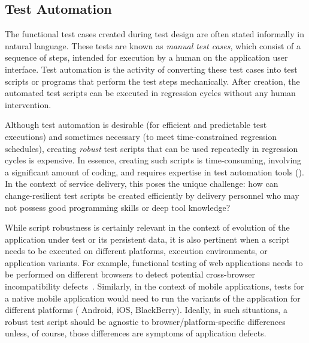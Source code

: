 \subsection{Test Automation}
\label{sec:test-automation}

The functional test cases created during test design are often stated informally
in natural language. These tests are known as \textit{manual test cases}, which
consist of a sequence of steps, intended for execution by a human on the
application user interface.  Test automation is the activity of converting these
test cases into test scripts or programs that perform the test steps
mechanically. After creation, the automated test scripts can be executed in
regression cycles without any human intervention.

Although test automation is desirable (\eg for efficient and predictable test
executions) and sometimes necessary (\eg to meet time-constrained regression
schedules), creating \textit{robust} test scripts that can be used repeatedly in
regression cycles is expensive. In essence, creating such scripts is
time-consuming, involving a significant amount of coding, and requires expertise
in test automation tools (\eg \cite{hpqtp,ibmrft,selenium}). In the context of
service delivery, this poses the unique challenge: how can change-resilient test
scripts be created efficiently by delivery personnel who may not possess good
programming skills or deep tool knowledge?


While script robustness is certainly relevant in the context of evolution of the
application under test or its persistent data, it is also pertinent when a
script needs to be executed on different platforms, execution environments, or
application variants. For example, functional testing of web applications needs
to be performed on different browsers to detect potential cross-browser
incompatibility
defects~\cite{Choudhary2010,Shauvik:2012,Choudhary:2013,Mesbah:2011}. Similarly,
in the context of mobile applications, tests for a native mobile application
would need to run the variants of the application for different platforms (\eg
Android, iOS, BlackBerry). Ideally, in such situations, a robust test script
should be agnostic to browser/platform-specific differences unless, of course,
those differences are symptoms of application defects.

